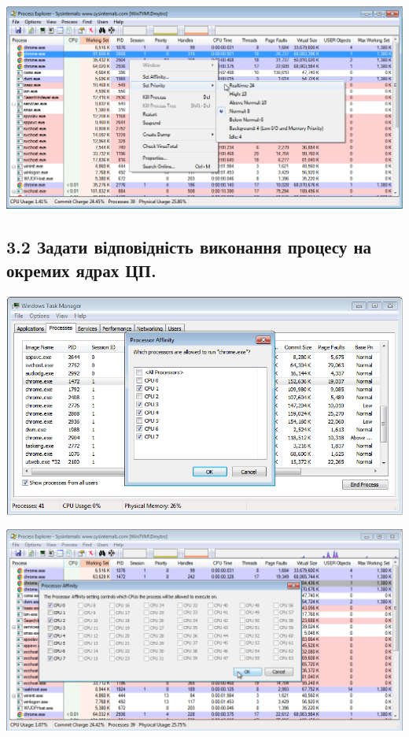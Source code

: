 \documentclass{article}
\begin{document}
\begin{normalsize}
	\begin{center}
		\includegraphics[scale=0.49]{priority2}
	\end{center}

	\subsection*{3.2 Задати відповідність виконання процесу на окремих ядрах ЦП.}
	\begin{center}
		\includegraphics[scale=0.6]{affinity1}
	\end{center}

	\begin{center}
		\includegraphics[scale=0.49]{affinity2}
	\end{center}


\end{normalsize}
\end{document}
